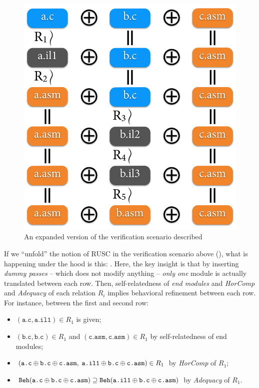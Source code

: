 \begin{figure}[t]
  \centering
  \includegraphics[width=0.90\linewidth]{images/fig-rusc-inline.png}
  \caption{An expanded version of the verification scenario described }
  \label{fig:rusc-inline}
\end{figure}
If we ``unfold'' the notion of RUSC in the verification scenario above (), what is happening under the hood is this: .
Here, the key insight is that by inserting {\it dummy passes} -- which does not modify anything -- {\it only one} module is actually translated between each row.
Then, self-relatedness of \emph{end modules} and \emph{HorComp} and \emph{Adequacy} of each relation $R_i$ implies behavioral refinement between each row.
For instance, between the first and second row:
\begin{itemize}
\item $(\texttt{a.c}, \texttt{a.il1}) \in R_1$ is given;
\item $(\texttt{b.c}, \texttt{b.c}) \in R_1$ and $(\texttt{c.asm}, \texttt{c.asm}) \in R_1$ by self-relatedness of end modules;
\item $(\texttt{a.c} \oplus \texttt{b.c} \oplus \texttt{c.asm},\; \texttt{a.il1} \oplus \texttt{b.c} \oplus \texttt{c.asm}) \in R_1$ by \emph{HorComp} of $R_1$;
\item $\mathtt{Beh}({\texttt{a.c} \oplus \texttt{b.c} \oplus \texttt{c.asm}}) \supseteq \mathtt{Beh}({\texttt{a.il1} \oplus \texttt{b.c} \oplus \texttt{c.asm}})$ by \emph{Adequacy} of $R_1$.
\end{itemize}

